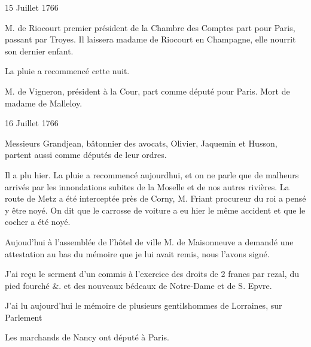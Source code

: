                      \begin{diary}{15 Juillet 1766}{}


                           M. de Riocourt
                           premier président de la Chambre des Comptes
                           part pour Paris, passant par
                              Troyes. Il
                           laissera madame de Riocourt en Champagne,
                           elle nourrit son dernier enfant. \bigskip


                         La pluie a recommencé cette nuit. \bigskip



                           M. de Vigneron, président à la
                           Cour, part comme
                           député pour Paris. Mort de
                              madame de Malleloy.
                        \bigskip


                     \end{diary}

                     \begin{diary}{16 Juillet 1766}{}


                           Messieurs
                           Grandjean, bâtonnier des avocats,
                              Olivier,
                           Jaquemin et Husson, partent aussi comme
                           députés de leur ordres. \bigskip


                         Il a plu hier. La pluie a recommencé aujourdhui, et on ne parle que de malheurs arrivés
                           par les innondations subites de la
                              Moselle
                           et de nos autres rivières. La route de Metz
                           a été interceptée près de Corny,
                              M. Friant
                           procureur du roi a pensé y être noyé. On dit que le
                           carrosse de voiture a eu hier le même accident
                           et que le cocher a été noyé. \bigskip


                         Aujoud'hui à l'assemblée de l'hôtel de ville
                           M. de Maisonneuve a demandé
                           une attestation
                           au bas du mémoire que je lui avait remis,
                           nous l'avons signé. \bigskip


                         J'ai
                           reçu le serment d'un commis à l'exercice
                           des droits de 2 francs par rezal, du pied
                           fourché \&. et des nouveaux bédeaux de
                           Notre-Dame et de S.
                              Epvre. \bigskip


                         J'ai lu aujourd'hui le mémoire de
                           plusieurs
                           gentilshommes de Lorraines,
                           sur Parlement
                        \bigskip


                         Les marchands de Nancy ont député à Paris. \bigskip


                     \end{diary}

